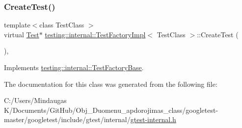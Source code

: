 \mbox{\label{classtesting_1_1internal_1_1_test_factory_impl_a8860c89bdb06450a5d5e8137ebd9d775}} 
\subsubsection{\texorpdfstring{CreateTest()}{CreateTest()}\hspace{0.1cm}{\footnotesize\ttfamily [3/3]}}
{\footnotesize\ttfamily template$<$class Test\+Class $>$ \\
virtual \mbox{\hyperlink{classtesting_1_1_test}{Test}}$\ast$ \mbox{\hyperlink{classtesting_1_1internal_1_1_test_factory_impl}{testing\+::internal\+::\+Test\+Factory\+Impl}}$<$ Test\+Class $>$\+::Create\+Test (\begin{DoxyParamCaption}{ }\end{DoxyParamCaption})\hspace{0.3cm}{\ttfamily [inline]}, {\ttfamily [virtual]}}



Implements \mbox{\hyperlink{classtesting_1_1internal_1_1_test_factory_base_a07ac3ca0b196cdb092da0bb186b7c030}{testing\+::internal\+::\+Test\+Factory\+Base}}.



The documentation for this class was generated from the following file\+:\begin{DoxyCompactItemize}
\item 
C\+:/\+Users/\+Mindaugas K/\+Documents/\+Git\+Hub/\+Obj\+\_\+\+Duomenu\+\_\+apdorojimas\+\_\+class/googletest-\/master/googletest/include/gtest/internal/\mbox{\hyperlink{googletest-master_2googletest_2include_2gtest_2internal_2gtest-internal_8h}{gtest-\/internal.\+h}}\end{DoxyCompactItemize}
